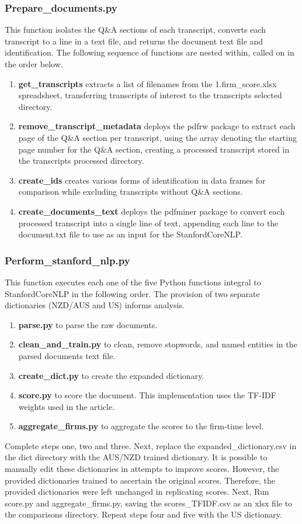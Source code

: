 \documentclass[11pt]{article}
\begin{document}
\subsubsection{Prepare\_documents.py}
This function isolates the Q\&A sections of each transcript, converts each transcript to a line in a text file, and returns the document text file and identification.
The following sequence of functions are nested within, called on in the order below.
\begin{enumerate}
    \item \textbf{get\_transcripts} extracts a list of filenames from the 1.firm\_score.xlsx spreadsheet, transferring transcripts of interest to the transcripts selected directory.
    \item \textbf{remove\_transcript\_metadata} deploys the pdfrw package to extract each page of the Q\&A section per transcript, using the array denoting the starting page number for the Q\&A section, creating a processed transcript stored in the transcripts processed directory.   
    \item \textbf{create\_ids} creates various forms of identification in data frames for comparison while excluding transcripts without Q\&A sections.
    \item \textbf{create\_documents\_text} deploys the pdfminer package to convert each processed transcript into a single line of text, appending each line to the document.txt file to use as an input for the StanfordCoreNLP.
\end{enumerate}
\subsubsection{Perform\_stanford\_nlp.py}
This function executes each one of the five Python functions integral to StanfordCoreNLP in the following order.
The provision of two separate dictionaries (NZD/AUS and US) informs analysis.
\begin{enumerate}
    \item \textbf{parse.py} to parse the raw documents.
    \item \textbf{clean\_and\_train.py} to clean, remove stopwords, and named entities in the parsed documents text file.
    \item \textbf{create\_dict.py} to create the expanded dictionary.
    \item \textbf{score.py} to score the document. This implementation uses the TF-IDF weights used in the article.
    \item \textbf{aggregate\_firms.py} to aggregate the scores to the firm-time level.
\end{enumerate}
Complete steps one, two and three.
Next, replace the expanded\_dictionary.csv in the dict directory with the AUS/NZD trained dictionary. 
It is possible to manually edit these dictionaries in attempts to improve scores. 
However, the provided dictionaries trained to ascertain the original scores. 
Therefore, the provided dictionaries were left unchanged in replicating scores.
Next, Run score.py and aggregate\_firms.py, saving the scores\_TFIDF.csv as an xlsx file to the comparisons directory. 
Repeat steps four and five with the US dictionary.
\end{document}
